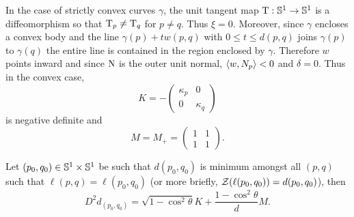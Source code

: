 \documentclass[a4paper, 12pt]{amsart}
\begin{document}
\begin{rem}
\label{rem:convex}
In the case of strictly convex curves \(\gamma\), the unit tangent map \(\tang : \S^1 \to \S^1\) is a diffeomorphism so that \(\tang_p \ne \tang_q\) for \(p \ne q\). Thus \(\xi = 0\). Moreover, since \(\gamma\) encloses a convex body and the line \(\gamma(p) + t w(p, q)\) with \(0 \leq t \leq d(p, q)\) joins \(\gamma(p)\) to \(\gamma(q)\) the entire line is contained in the region enclosed by \(\gamma\). Therefore \(w\) points inward and since \(\nor\) is the outer unit normal, \(\inpr{w}{N_p} < 0\) and \(\delta = 0\). Thus in the convex case,
\[
K = -\begin{pmatrix}
\kappa_{p} & 0 \\
0 & \kappa_{q}
\end{pmatrix}
\]
is negative definite and
\[
M = M_+ = \begin{pmatrix}
1 & 1 \\
1 & 1
\end{pmatrix}.
\]
\end{rem}

\begin{prop}
\label{prop:spatial_var}
Let $(p_0, q_0) \in \S^1 \times \S^1$ be such that $d(p_0, q_0)$ is minimum amongst all $(p,q)$ such that $\ell(p, q) = \ell(p_0, q_0)$ (or more briefly, $\chordarcprofile(\ell(p_0,q_0)) = d(p_0, q_0)$), then 
\[
D^2d_{(p_0,q_0)} =  \sqrt{1-\cos^2\theta}K + \frac{1-\cos^2 \theta}{d} M.
\]
\end{prop}
\end{document}
